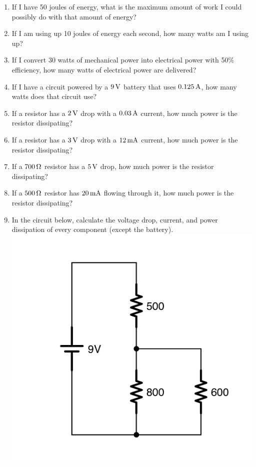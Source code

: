 
\begin{enumerate}
\item If I have 50 joules of energy, what is the maximum amount of work I could possibly do with that amount of energy?
\item If I am using up 10 joules of energy each second, how many watts am I using up?
\item If I convert 30 watts of mechanical power into electrical power with 50\% efficiency, how many watts of electrical power are delivered?
\item If I have a circuit powered by a $9\,\si{\volt}$ battery that uses $0.125\,\si{\ampere}$, how many watts does that circuit use?
\item If a resistor has a $2\,\si{\volt}$ drop with a $0.03\,\si{\ampere}$ current, how much power is the resistor dissipating?
\item If a resistor has a $3\,\si{\volt}$ drop with a $12\,\si{\milli\ampere}$ current, how much power is the resistor dissipating?
\item If a $700\,\si{\ohm}$ resistor has a $5\,\si{\volt}$ drop, how much power is the resistor dissipating?
\item If a $500\,\si{\ohm}$ resistor has $20\,\si{\milli\ampere}$ flowing through it, how much power is the resistor dissipating?
\item In the circuit below, calculate the voltage drop, current, and power dissipation of every component (except the battery). \\ \includegraphics[scale=0.08]{ExampleForPowerDissipation.png}
\end{enumerate}
